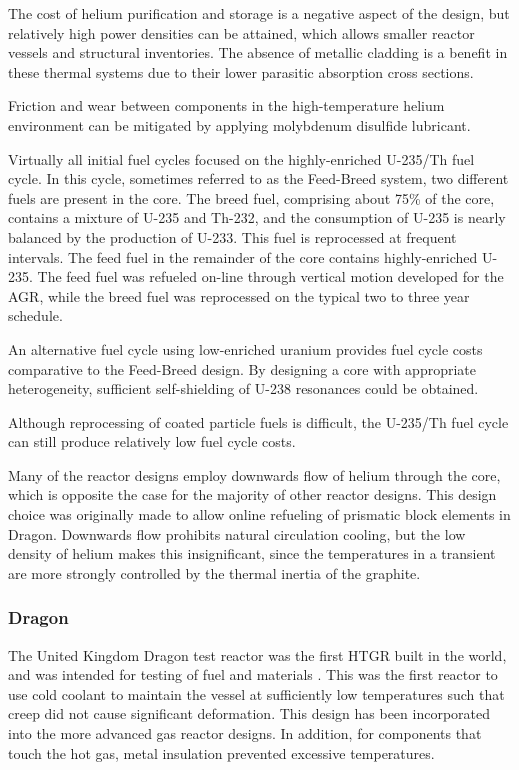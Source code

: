 \documentclass[10pt]{article}
\numberwithin{equation}{section} %
\begin{document}
The cost of helium purification and storage is a negative aspect of the design, but relatively high power densities can be attained, which allows smaller reactor vessels and structural inventories. The absence of metallic cladding is a benefit in these thermal systems due to their lower parasitic absorption cross sections.

Friction and wear between components in the high-temperature helium environment can be mitigated by applying molybdenum disulfide lubricant.

Virtually all initial fuel cycles focused on the highly-enriched U-235/Th fuel cycle. In this cycle, sometimes referred to as the Feed-Breed system, two different fuels are present in the core. The breed fuel, comprising about 75\% of the core, contains a mixture of U-235 and Th-232, and the consumption of U-235 is nearly balanced by the production of U-233. This fuel is reprocessed at frequent intervals. The feed fuel in the remainder of the core contains highly-enriched U-235. The feed fuel was refueled on-line through vertical motion developed for the AGR, while the breed fuel was reprocessed on the typical two to three year schedule. 

An alternative fuel cycle using low-enriched uranium provides fuel cycle costs comparative to the Feed-Breed design. By designing a core with appropriate heterogeneity, sufficient self-shielding of U-238 resonances could be obtained.

Although reprocessing of coated particle fuels is difficult, the U-235/Th fuel cycle can still produce relatively low fuel cycle costs.

Many of the reactor designs employ downwards flow of helium through the core, which is opposite the case for the majority of other reactor designs. This design choice was originally made to allow online refueling of prismatic block elements in Dragon. Downwards flow prohibits natural circulation cooling, but the low density of helium makes this insignificant, since the temperatures in a transient are more strongly controlled by the thermal inertia of the graphite. 

\subsubsection{Dragon}
The United Kingdom Dragon test reactor was the first HTGR built in the world, and was intended for testing of fuel and materials \cite{Dragon}. This was the first reactor to use cold coolant to maintain the vessel at sufficiently low temperatures such that creep did not cause significant deformation. This design has been incorporated into the more advanced gas reactor designs. In addition, for components that touch the hot gas, metal insulation prevented excessive temperatures. 
\end{document}
